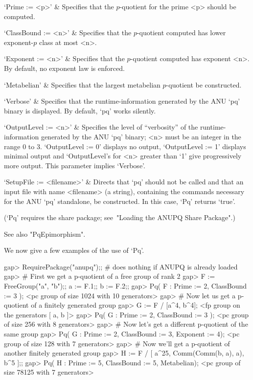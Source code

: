 \beginitems

`Prime := <p>' & 
Specifies that the $p$-quotient for the prime <p> should be computed.

`ClassBound := <n>' & 
Specifies that the $p$-quotient computed has lower exponent-$p$ class  at
most <n>.

`Exponent := <n>' & 
Specifies that the $p$-quotient computed has exponent <n>. By default, no
exponent law is enforced.

`Metabelian' & 
Specifies that the largest metabelian $p$-quotient be constructed.

`Verbose' &
Specifies that the runtime-information generated by the ANU  `pq'  binary
is displayed. By default, `pq' works silently.

`OutputLevel := <n>' &
Specifies the level of ``verbosity'' of the runtime-information generated
by the ANU `pq' binary; <n> must be an integer  in  the  range  0  to  3.
`OutputLevel := 0'  displays  no  output,  `OutputLevel  :=  1'  displays
minimal  output  and  `OutputLevel's  for  <n>  greater  than  `1'   give
progressively more output. This parameter implies `Verbose'. 

`SetupFile := <filename>' &
Directs that `pq' should not be called and that an input file  with  name
<filename> (a string), containing the commands necessary for the ANU `pq'
standalone, be constructed. In this case, `Pq' returns `true'.

\enditems

(`Pq' requires the {\ANUPQ} share package; see~"Loading  the  ANUPQ  Share
Package".)

See also "PqEpimorphism".

We now give a few examples of the use of `Pq'.

\beginexample
gap> RequirePackage("anupq");; # does nothing if ANUPQ is already loaded
gap> # First we get a p-quotient of a free group of rank 2
gap> F := FreeGroup("a", "b");; a := F.1;; b := F.2;;
gap> Pq( F : Prime := 2, ClassBound := 3 ); 
<pc group of size 1024 with 10 generators>
gap> # Now let us get a p-quotient of a finitely generated group
gap> G := F / [a^4, b^4];
<fp group on the generators [ a, b ]>
gap> Pq( G : Prime := 2, ClassBound := 3 ); 
<pc group of size 256 with 8 generators>
gap> # Now let's get a different p-quotient of the same group
gap> Pq( G : Prime := 2, ClassBound := 3, Exponent := 4); 
<pc group of size 128 with 7 generators>
gap> # Now we'll get a p-quotient of another finitely generated group 
gap> H := F / [ a^25, Comm(Comm(b, a), a), b^5 ];;
gap> Pq( H : Prime := 5, ClassBound := 5, Metabelian);
<pc group of size 78125 with 7 generators>
\endexample

